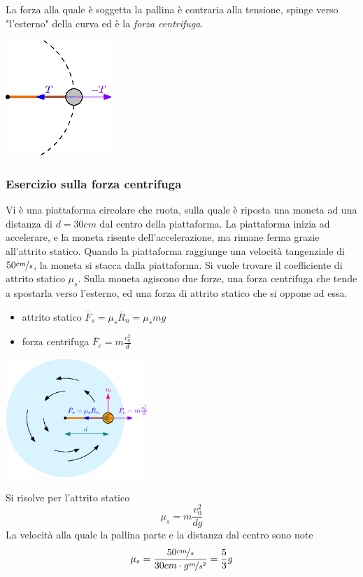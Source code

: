 \documentclass[10pt, letterpaper]{report}
\begin{document}
La forza alla quale è soggetta la pallina è contraria alla tensione, spinge verso "l'esterno" della curva ed 
è la \textit{forza centrifuga}.\begin{center}
    \includegraphics[width=0.3\textwidth]{images/forzaCent2.eps}
\end{center}
\subsubsection{Esercizio sulla forza centrifuga}
Vi è una piattaforma circolare che ruota, sulla quale è riposta una moneta ad una distanza di $d=30cm$ dal centro 
della piattaforma. La piattaforma inizia ad accelerare, e la moneta risente dell'accelerazione, ma rimane 
ferma grazie all'attrito statico. Quando la piattaforma raggiunge una velocità 
tangenziale di $50\nicefrac{cm}{s}$, la moneta si stacca dalla piattaforma. Si vuole trovare il coefficiente 
di attrito statico $\mu_s$.\acc 
Sulla moneta agiscono due forze, una forza centrifuga che tende a spostarla verso l'esterno, ed una forza di 
attrito statico che si oppone ad essa. \begin{itemize}
\item attrito statico $\bar F_s=\mu_s\bar R_n=\mu_s mg$
\item forza centrifuga $\bar F_c=m\frac{v_0^2}{d}$
\end{itemize}\begin{center}
    \includegraphics[width=0.4\textwidth]{images/forzaCent3.eps}
\end{center}
Si risolve per l'attrito statico 
$$ \mu_s=m\frac{v_0^2}{dg}$$
La velocità alla quale la pallina parte e la distanza dal centro sono note 
$$ \mu_s=\frac{50 \nicefrac{cm}{s}}{30cm\cdot g\nicefrac{m}{s^2}}=\frac{5}{3}g$$
\end{document}
